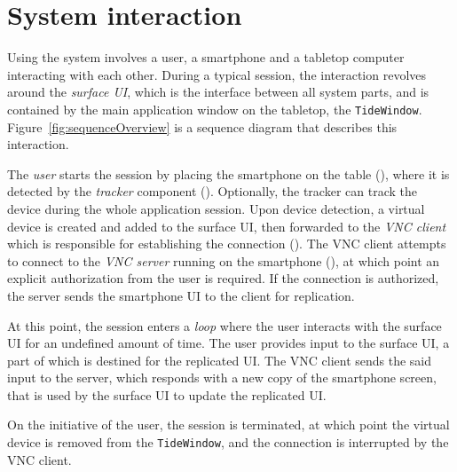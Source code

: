 \section{System interaction}

Using the system involves a user, a smartphone and a tabletop computer interacting with each other.
During a typical session, the interaction revolves around the \emph{surface UI}, which is the interface between all system parts, and is contained by the main application window on the tabletop, the \texttt{TideWindow}.
Figure~\ref{fig:sequenceOverview} is a sequence diagram that describes this interaction.

The \emph{user} starts the session by placing the smartphone on the table (), where it is detected by the \emph{tracker} component ().
Optionally, the tracker can track the device during the whole application session.
Upon device detection, a virtual device is created and added to the surface UI, then forwarded to the \emph{VNC client} which is responsible for establishing the connection ().
The VNC client attempts to connect to the \emph{VNC server} running on the smartphone (), at which point an explicit authorization from the user is required.
If the connection is authorized, the server sends the smartphone UI to the client for replication.

At this point, the session enters a \emph{loop} where the user interacts with the surface UI for an undefined amount of time.
The user provides input to the surface UI, a part of which is destined for the replicated UI.
The VNC client sends the said input to the server, which responds with a new copy of the smartphone screen, that is used by the surface UI to update the replicated UI.

On the initiative of the user, the session is terminated, at which point the virtual device is removed from the \texttt{TideWindow}, and the connection is interrupted by the VNC client.

